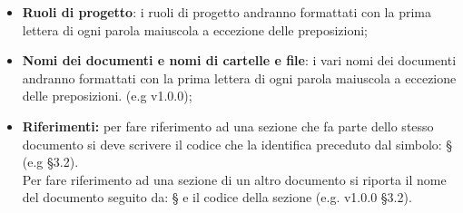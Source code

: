 \begin{itemize}
\begin{itemize}
                            \item\textbf{Ruoli di progetto}: i ruoli di progetto andranno formattati con la prima lettera di ogni parola maiuscola a eccezione delle preposizioni;
                            \item\textbf{Nomi dei documenti e nomi di cartelle e file}: i vari nomi dei documenti andranno formattati con la prima lettera di ogni parola maiuscola a eccezione delle preposizioni. (e.g  v1.0.0);
                            \item\textbf{Riferimenti:} per fare riferimento ad una sezione che fa parte dello stesso documento si deve scrivere il codice che la identifica preceduto dal simbolo: § (e.g §3.2). \\
                                Per fare riferimento ad una sezione di un altro documento si riporta il nome del documento seguito da: § e il codice della sezione (e.g.  v1.0.0 §3.2).\\
                        \end{itemize}
                \end{itemize}
